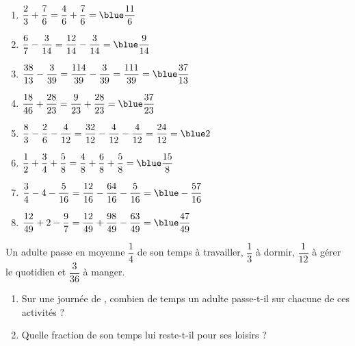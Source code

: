 \begin{colonne*exercice}
\begin{corrige}
   \ \\ [-5mm]
   \begin{enumerate}
      \item $\dfrac23+\dfrac76 =\dfrac46+\dfrac76 =\blue \dfrac{11}6$ \bigskip
      \item $\dfrac67-\dfrac3{14} =\dfrac{12}{14}-\dfrac3{14} =\blue \dfrac9{14}$ \bigskip
      \item $\dfrac{38}{13}-\dfrac3{39} =\dfrac{114}{39}-\dfrac3{39} =\dfrac{111}{39} =\blue \dfrac{37}{13}$ \bigskip
      \item $\dfrac{18}{46}+\dfrac{28}{23} =\dfrac{9}{23}+\dfrac{28}{23} =\blue \dfrac{37}{23}$ \bigskip
      \item $\dfrac83-\dfrac26-\dfrac4{12} =\dfrac{32}{12}-\dfrac{4}{12}-\dfrac{4}{12} =\dfrac{24}{12} =\blue 2$ \bigskip
      \item $\dfrac12+\dfrac34+\dfrac58 =\dfrac48+\dfrac68+\dfrac58 =\blue \dfrac{15}{8}$ \bigskip
      \item $\dfrac34-4-\dfrac5{16} =\dfrac{12}{16}-\dfrac{64}{16}-\dfrac{5}{16} =\blue -\dfrac{57}{16}$ \bigskip
      \item $\dfrac{12}{49}+2-\dfrac97 =\dfrac{12}{49}+\dfrac{98}{49}-\dfrac{63}{49} =\blue \dfrac{47}{49}$
   \end{enumerate}
\end{corrige}

\bigskip


\begin{exercice} %
   Un adulte passe en moyenne $\dfrac14$ de son temps à travailler, $\dfrac13$ à dormir, $\dfrac{1}{12}$ à gérer le quotidien et $\dfrac{3}{36}$ à manger.
   \begin{enumerate}
      \item Sur une journée de , combien de temps un adulte passe-t-il sur chacune de ces activités ?
      \item Quelle fraction de son temps lui reste-t-il pour ses loisirs ?  
   \end{enumerate}
\end{exercice}


\end{colonne*exercice}
